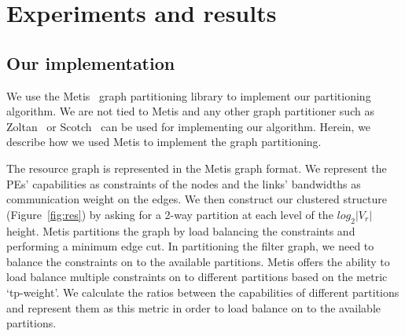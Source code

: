 \section{Experiments and results}
\label{sec:experiments-results}



\subsection{Our implementation}
\label{sec:our-implementation}

We use the Metis~\cite{gkar95} graph partitioning library to implement
our partitioning algorithm. We are not tied to Metis and any other graph
partitioner such as Zoltan~\cite{kdev09} or Scotch~\cite{cche08} can be
used for implementing our algorithm. Herein, we describe how we used
Metis to implement the graph partitioning.

The resource graph is represented in the Metis graph format. We
represent the PEs' capabilities as constraints of the nodes and the
links' bandwidths as communication weight on the edges. We then
construct our clustered structure (Figure~\ref{fig:res}) by asking for a
2-way partition at each level of the $log_2|V_r|$ height. Metis
partitions the graph by load balancing the constraints and performing a
minimum edge cut.  In partitioning the filter graph, we need to balance
the constraints on to the available partitions. Metis offers the ability
to load balance multiple constraints on to different partitions based on
the metric \mbox{`tp-weight'}. We calculate the ratios between the
capabilities of different partitions and represent them as this metric
in order to load balance on to the available partitions.


